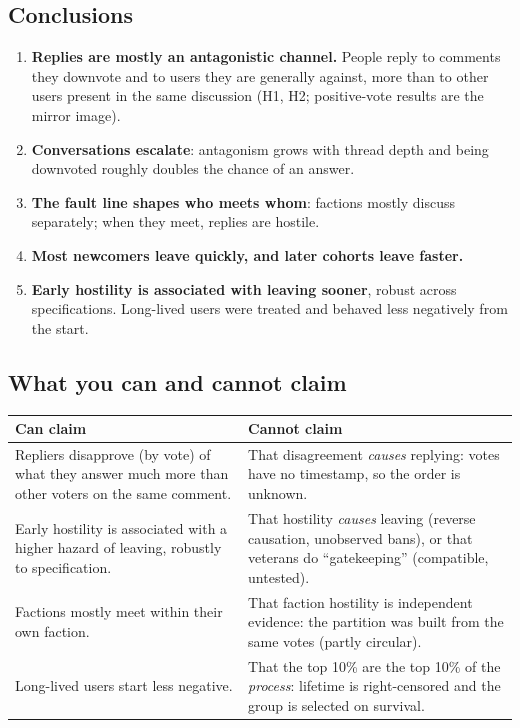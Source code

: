 \documentclass[11pt,a4paper]{article}
\begin{document}
\subsection{Conclusions}
\begin{enumerate}
  \item \textbf{Replies are mostly an antagonistic channel.} People reply to comments they downvote and to users they are generally against, more than to other users present in the same discussion (H1, H2; positive-vote results are the mirror image).
  \item \textbf{Conversations escalate}: antagonism grows with thread depth and being downvoted roughly doubles the chance of an answer.
  \item \textbf{The fault line shapes who meets whom}: factions mostly discuss separately; when they meet, replies are hostile.
  \item \textbf{Most newcomers leave quickly, and later cohorts leave faster.}
  \item \textbf{Early hostility is associated with leaving sooner}, robust across specifications. Long-lived users were treated and behaved less negatively from the start.
\end{enumerate}

\subsection{What you can and cannot claim}
\begin{tabularx}{\textwidth}{@{}Y Y@{}}
\toprule
Can claim & Cannot claim \\
\midrule
Repliers disapprove (by vote) of what they answer much more than other voters on the same comment. & That disagreement \emph{causes} replying: votes have no timestamp, so the order is unknown. \\
Early hostility is associated with a higher hazard of leaving, robustly to specification. & That hostility \emph{causes} leaving (reverse causation, unobserved bans), or that veterans do ``gatekeeping'' (compatible, untested). \\
Factions mostly meet within their own faction. & That faction hostility is independent evidence: the partition was built from the same votes (partly circular). \\
Long-lived users start less negative. & That the top 10\% are the top 10\% of the \emph{process}: lifetime is right-censored and the group is selected on survival. \\
\bottomrule
\end{tabularx}
\end{document}
